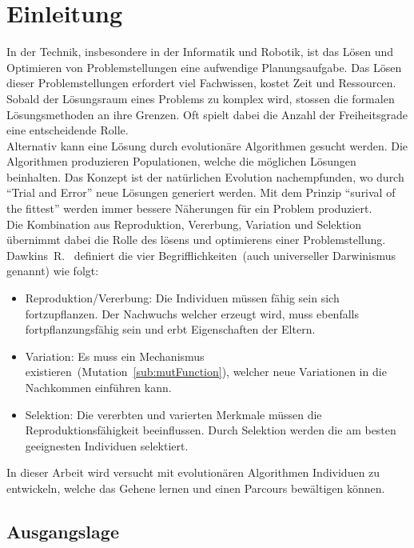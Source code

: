 %
%


\chapter{Einleitung}

  In der Technik, insbesondere in der Informatik und Robotik,
  ist das Lösen und Optimieren von Problemstellungen eine aufwendige Planungsaufgabe.
  Das Lösen dieser Problemstellungen erfordert viel Fachwissen, kostet Zeit und Ressourcen.
  Sobald der Lösungsraum eines Problems zu komplex wird, stossen die formalen Lösungsmethoden an ihre Grenzen.
  Oft spielt dabei die Anzahl der Freiheitsgrade eine entscheidende Rolle.
  \\
  Alternativ kann eine Lösung durch evolutionäre Algorithmen gesucht werden.
  Die Algorithmen produzieren Populationen, welche die möglichen Lösungen beinhalten.
  Das Konzept ist der natürlichen Evolution nachempfunden, wo durch ``Trial and Error'' neue Lösungen generiert werden.
  Mit dem Prinzip ``surival of the fittest'' werden immer bessere Näherungen für ein Problem produziert.
  \\
  Die Kombination aus Reproduktion, Vererbung, Variation und Selektion
  übernimmt dabei die Rolle des lösens und optimierens einer Problemstellung.
  \\
  Dawkins~R.~\cite{book:universalDarwinism} definiert die vier Begrifflichkeiten~(auch universeller Darwinismus genannt) wie folgt:
  \begin{itemize}
    \item Reproduktion/Vererbung: Die Individuen müssen fähig sein sich fortzupflanzen. Der Nachwuchs welcher erzeugt wird, muss ebenfalls fortpflanzungsfähig sein und erbt Eigenschaften der Eltern.
    \item Variation: Es muss ein Mechanismus existieren~(Mutation~\vref{sub:mutFunction}), welcher neue Variationen in die Nachkommen einführen kann.
    \item Selektion: Die vererbten und varierten Merkmale müssen die Reproduktionsfähigkeit beeinflussen. Durch Selektion werden die am besten geeignesten Individuen selektiert.
  \end{itemize}

  In dieser Arbeit wird versucht mit evolutionären Algorithmen Individuen zu entwickeln,
  welche das Gehene lernen und einen Parcours bewältigen können.


  \section{Ausgangslage}

